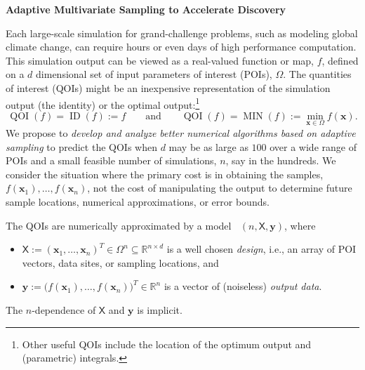 \documentclass[11pt]{NSFamsart}
\DeclareMathOperator{\QOI}{QOI} %
\DeclareMathOperator{\APP}{\widehat{\QOI}}
\DeclareMathOperator{\MIN}{MIN}
\DeclareMathOperator{\ID}{ID}
\newcommand{\reals}{{\mathbb{R}}}
\newcommand{\mX}{\mathsf{X}}
\newcommand{\bx}{{\boldsymbol{x}}}
\newcommand{\by}{{\boldsymbol{y}}}
\begin{document}

\begin{center}
\Large \textbf{
Adaptive Multivariate Sampling to Accelerate  Discovery\\ 
}
\end{center}
\vspace{-2ex}

\setcounter{tocdepth}{1}
\tableofcontents

\vspace{-6ex}

Each large-scale simulation for grand-challenge problems, such as modeling global climate change, can require hours or even days of high performance computation.  This simulation output can be viewed as a real-valued function or map, $f$, defined on a $d$ dimensional set of input parameters of interest (POIs), $\Omega$.  The quantities of interest (QOIs) might be 
an inexpensive representation of the simulation output (the identity) or the optimal output:\footnote{Other useful QOIs include the location of the optimum output and (parametric) integrals.}  
\begin{equation} \label{eq:ourQOIs}
    \QOI(f) = \ID(f) := f \qquad \text{and} \qquad \QOI(f) = \MIN(f) := \min_{\bx \in \Omega} f(\bx).
\end{equation}
We propose to \emph{develop and analyze better numerical algorithms based on adaptive sampling} to predict the QOIs when $d$ may be as large as $100$ over a wide range of POIs and a small feasible number of simulations, $n$, say in the hundreds.  We consider the situation where the primary cost is in obtaining the samples, $f(\bx_1), \ldots, f(\bx_n)$, not the cost of manipulating the output to determine future sample locations, numerical approximations, or error bounds. 

The QOIs are numerically approximated by a model $\APP(n,\mX,\by)$, where 
\begin{itemize}
    \item $\mX := (\bx_1, \ldots, \bx_n)^T \in \Omega^{n} \subseteq \reals^{n \times d}$ is a well chosen \emph{design}, i.e., an array of POI vectors, data sites, or sampling locations, and
    
    \item $\by := \bigl(f(\bx_1), \ldots, f(\bx_n) \bigr)^T \in \reals^n$ is a vector of (noiseless) \emph{output data}.
\end{itemize}   
The $n$-dependence of $\mX$ and $\by$ is implicit.  
\end{document}
